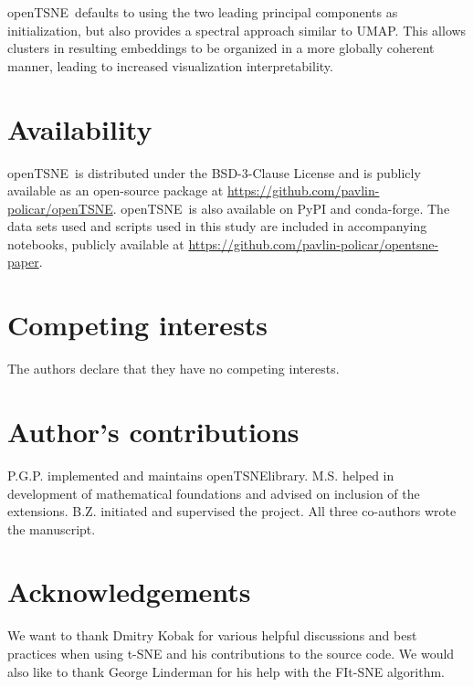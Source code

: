 \documentclass[letter]{article}
\newcommand{\opentsne}{\textsf{openTSNE}}
\begin{document}
\opentsne\ defaults to using the two leading principal components as
initialization, but also provides a spectral approach similar to UMAP.  This
allows clusters in resulting embeddings to be organized in a more globally
coherent manner, leading to increased visualization interpretability.

\section*{Availability}

\opentsne\ is distributed under the BSD-3-Clause License and is publicly
available as an open-source package at
\url{https://github.com/pavlin-policar/openTSNE}. \opentsne\ is also available
on \textsf{PyPI} and \textsf{conda-forge}. The data sets used and scripts used
in this study are included in accompanying notebooks, publicly available at
\url{https://github.com/pavlin-policar/opentsne-paper}.

\section*{Competing interests}
The authors declare that they have no competing interests.

\section*{Author's contributions}
P.G.P. implemented and maintains \opentsne library. M.S. helped in development
of mathematical foundations and advised on inclusion of the extensions.
B.Z. initiated and supervised the project. All three co-authors wrote
the manuscript.

\section*{Acknowledgements}
We want to thank Dmitry Kobak for various helpful discussions and best practices
when using t-SNE and his contributions to the source code. We would also
like to thank George Linderman for his help with the FIt-SNE algorithm.

\end{document}
